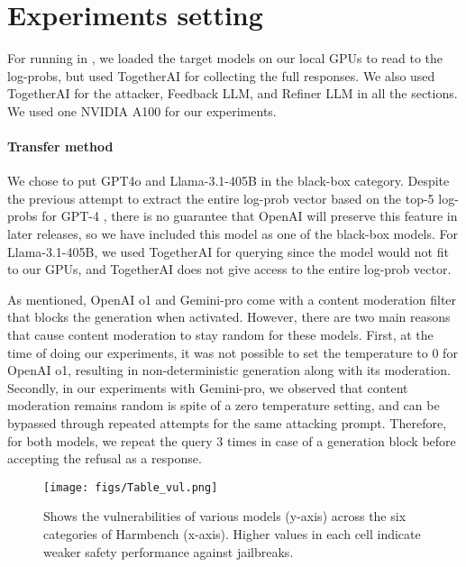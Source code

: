 \section{Experiments setting}\label{app: experiment_set}
For running  in , we loaded the target models on our local GPUs to read to the log-probs, but used TogetherAI \cite{together_ai} for collecting the full responses. We also used TogetherAI for the attacker, Feedback LLM, and Refiner LLM in all the sections. We used one NVIDIA A100 for our experiments. 

\paragraph{Transfer method}
We chose to put GPT4o and Llama-3.1-405B in the black-box category. Despite the previous attempt to extract the entire log-prob vector based on the top-5 log-probs for GPT-4 \cite{hayase2024querybasedadversarialpromptgeneration}, there is no guarantee that OpenAI will preserve this feature in later releases, so we have included this model as one of the black-box models. For Llama-3.1-405B, we used TogetherAI for querying since the model would not fit to our GPUs, and TogetherAI does not give access to the entire log-prob vector. 

As mentioned, OpenAI o1 and Gemini-pro come with a content moderation filter that blocks the generation when activated. However, there are two main reasons that cause content moderation to stay random for these models. First, at the time of doing our experiments, it was not possible to set the temperature to 0 for OpenAI o1, resulting in non-deterministic generation along with its moderation. Secondly,  in our experiments with Gemini-pro, we observed that content moderation remains random is spite of a zero temperature setting, and can be bypassed through repeated attempts for the same attacking prompt. Therefore, for both models, we repeat the query 3 times in case of a generation block before accepting the refusal as a response.

\begin{figure}
     \centering
     \texttt{[image: figs/Table\_vul.png]}
     \vspace{-0.1in}
     \caption{Shows the vulnerabilities of various models (y-axis) across the six categories of Harmbench (x-axis). Higher values in each cell indicate weaker safety performance against jailbreaks.}
     \label{table_vul}
\end{figure}


